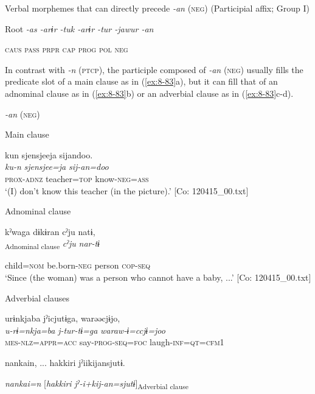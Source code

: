 \ea\label{ex:8-82}
  Verbal morphemes that can directly precede \textit{-an} (\textsc{neg}) (Participial affix; Group I)

  Root  \textit{-as  -arɨr  -tuk  -arɨr  -tur  -jawur  -an}

    \textsc{caus}  \textsc{pass}  \textsc{prpr}  \textsc{cap}  \textsc{prog}  \textsc{pol}  \textsc{neg}
\z

In contrast with \textit{-n} (\textsc{ptcp}), the participle composed of \textit{-an} (\textsc{neg}) usually fills the predicate slot of a main clause as in (\ref{ex:8-83}a), but it can fill that of an adnominal clause as in (\ref{ex:8-83}b) or an adverbial clause as in (\ref{ex:8-83}c-d).

\ea\label{ex:8-83}
  \textit{-an} (\textsc{neg})

  Main clause

\ea
{\TM}
\glll  kun  {\textbar}sjensjee{\textbar}ja  sijandoo.\\
\textit{ku-n}  \textit{sjensjee=ja}  \textit{sij-an=doo}\\
\textsc{prox}-\textsc{adnz}  teacher=\textsc{top}  know-\textsc{neg}=\textsc{ass}\\
\glt ‘(I) don’t know this teacher (in the picture).’ [Co: 120415\_00.txt]

  Adnominal clause

\ex
{\TM}
\glll  kˀwaga  dɨkɨran  cˀju  natɨ,\\
[\textit{kˀwa=ga}  \textit{dɨkɨr-an}]\textsubscript{Adnominal clause}  \textit{cˀju}  \textit{nar-tɨ}

      child=\textsc{nom}  be.born-\textsc{neg}  person  \textsc{cop}-\textsc{seq}\\
\glt ‘Since (the woman) was a person who cannot have a baby, ...’ [Co: 120415\_00.txt]
\z

  Adverbial clauses

\ex
{\TM}
\glll  urɨnkjaba  jˀicjutɨga,  warəəcjɨjo,\\
\textit{u-rɨ=nkja=ba}  \textit{j-tur-tɨ=ga}  \textit{waraw-ɨ=ccjɨ=joo}\\
\textsc{mes}-\textsc{nlz}=\textsc{appr}=\textsc{acc}  say-\textsc{prog}-\textsc{seq}=\textsc{foc}  laugh-\textsc{inf}=\textsc{qt}=\textsc{cfm1}

      {\textbar}nankai{\textbar}n, ...  {\textbar}hakkiri{\textbar}  jˀiikijansjutɨ.

      \textit{nankai=n}  [\textit{hakkiri}  \textit{jˀ-i+kij-an=sjutɨ}]\textsubscript{Adverbial clause}

